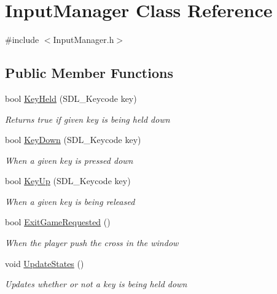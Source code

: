 \hypertarget{class_input_manager}{}\section{Input\+Manager Class Reference}
\label{class_input_manager}


{\ttfamily \#include $<$Input\+Manager.\+h$>$}

\subsection*{Public Member Functions}
\begin{DoxyCompactItemize}
\item 
bool \mbox{\hyperlink{class_input_manager_af0d58a0ae0e6cc0ad9205d3bb3b3f8fe}{Key\+Held}} (S\+D\+L\+\_\+\+Keycode key)
\begin{DoxyCompactList}\small\item\em Returns true if given key is being held down \end{DoxyCompactList}\item 
bool \mbox{\hyperlink{class_input_manager_ab506676fb41f532dd3e204eea13b44bc}{Key\+Down}} (S\+D\+L\+\_\+\+Keycode key)
\begin{DoxyCompactList}\small\item\em When a given key is pressed down \end{DoxyCompactList}\item 
bool \mbox{\hyperlink{class_input_manager_a51be2b05d46039439a8f104d374a18aa}{Key\+Up}} (S\+D\+L\+\_\+\+Keycode key)
\begin{DoxyCompactList}\small\item\em When a given key is being released \end{DoxyCompactList}\item 
bool \mbox{\hyperlink{class_input_manager_a1c2f91069dcc0cc7c47947cc56e5846b}{Exit\+Game\+Requested}} ()
\begin{DoxyCompactList}\small\item\em When the player push the cross in the window \end{DoxyCompactList}\item 
void \mbox{\hyperlink{class_input_manager_a0c1dc308a646b8fcdbdae7f9feea9287}{Update\+States}} ()
\begin{DoxyCompactList}\small\item\em Updates whether or not a key is being held down \end{DoxyCompactList}\end{DoxyCompactItemize}
